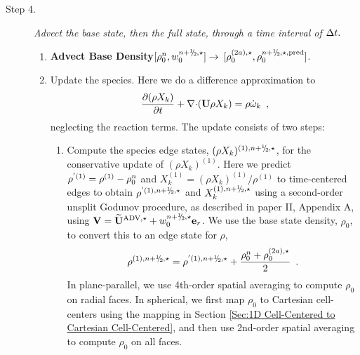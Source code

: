 \begin{description}
\begin{enumerate}
\end{enumerate}

\item[Step 4.] {\em Advect the base state, then the full state, through a time interval 
of $\Delta t.$}

\begin{enumerate}
\renewcommand{\theenumi}{{\bf \alph{enumi}}}

\item {\bf Advect Base Density}$[\rhozero^{n},w_0^{\nph,\star}] \rightarrow$ 
$[\rho_0^{(2a),\star}, \rho_0^{\nph,\star,{\rm pred}}]$.

\item Update the species.  Here we do a difference approximation
  to 
  \begin{equation}
  \frac{\partial (\rho X_k)}{\partial t} + \mathbf{\nabla} \mathbf{\cdot} ({\bf U} \rho X_k) =
         \rho {\dot{\omega}}_k \enskip , \label{eq:species}
  \end{equation}
  neglecting the reaction terms.  The update consists of two steps:

  \begin{enumerate}
  \renewcommand{\labelenumii}{{\bf \roman{enumii}}.}

  \item Compute the species edge states, $(\rho X_k)^{(1),\nph,\star}$,
  for the conservative update of $(\rho X_k)^{(1)}$. 
  Here we predict $\rho^{'(1)} = \rho^{(1)} - \rho_0^n$ and 
  $X_k^{(1)} = (\rho X_k)^{(1)} / \rho^{(1)}$ to time-centered edges to obtain 
  $\rho^{'(1),\nph,\star}$ and $X_k^{(1),\nph,\star}$ using a second-order
  unsplit Godunov procedure, as described in paper II,
  Appendix A, using $\Vb = \uadvone+w_0^{\nph,\star} \er$.  We use the base
  state density, $\rho_0$, to convert this to an edge state for $\rho$,
\begin{equation}
\rho^{(1),\nph,\star} = 
\rho^{'(1),\nph,\star} + \frac{\rho_0^n + \rho_0^{(2a),\star}}{2} \enskip .
\label{eq:rhoXedgestate}
\end{equation}
  In plane-parallel, we use 4th-order spatial averaging to compute $\rho_0$ on 
  radial faces.  In spherical, we first map $\rho_0$ to Cartesian cell-centers 
  using the mapping in Section \ref{Sec:1D Cell-Centered to Cartesian Cell-Centered}, 
  and then use 2nd-order spatial averaging to compute $\rho_0$ on all faces.


\end{enumerate}
\end{enumerate}
\end{description}

